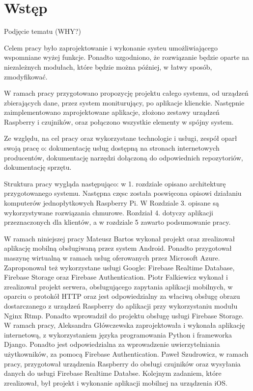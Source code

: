 \chapter{Wstęp}

Podjęcie tematu (WHY?)

Celem pracy było zaprojektowanie i wykonanie systeu umożliwiającego wspomniane wyżej funkcje. Ponadto uzgodniono, że rozwiązanie będzie oparte na niezależnych modułach, które będzie można później, w łatwy sposób, zmodyfikować.

W ramach pracy przygotowano propozycję projektu całego systemu, od urządzeń zbierających dane, przez system moniturujący, po aplikacje klienckie. Następnie zaimplementowano zaprojektowane aplikacje, złożono zestawy urządzeń Raspberry i czujników, oraz połączono wszystkie elementy w spójny system.

Ze względu, na cel pracy oraz wykorzystane technologie i usługi, zespół oparł swoją pracę o: dokumentację usług dostępną na stronach internetowych producentów, dokumentację narzędzi dołączoną do odpowiednich repozytoriów, dokumentację sprzętu.

Struktura pracy wygląda następująco: w 1. rozdziale opisano architekturę przygotowanego systemu. Następna częsc została poswięcona opisowi działaniu komputerów jednopłytkowych Raspberry Pi. W Rozdziale 3. opisane są wykorzystywane rozwiązania chmurowe. Rozdział 4. dotyczy aplikacji przeznaczonych dla klientów, a w rozdziale 5 zawarto podsumowanie pracy.

W ramach niniejszej pracy Mateusz Bartos wykonał projekt oraz zrealizował aplikację mobilną obsługiwaną przez system Android. Ponadto przygotował maszynę wirtualną w ramach usług oferowanych przez Microsoft Azure. Zaproponował też wykorzystane usługi Google: Firebase Realtime Database, Firebase Storage oraz Firebase Authentication. 
Piotr Falkiewicz wykonał i zrealizował projekt serwera, obsługującego zapytania aplikacji mobilnych, w oparciu o protokół HTTP oraz jest odpowiedzialny za właciwą obsługę  obrazu dostarczanego z urządzeń Raspberry do aplikacji przy wykorzystaniu modułu Nginx Rtmp. Ponadto wprowadził do projektu obsługę usługi Firebase Storage.
W ramach pracy, Aleksandra Główczewska zaprojektowała i wykonała aplikację internetową, z wykorzystaniem języka programowania Python i frameworka Django. Ponadto jest odpowiedzialna za wprowadzenie uwierzytelniania użytkowników, za pomocą Firebase Authentication. 
Paweł Szudrowicz, w ramach pracy, przygotował urządzenia Raspberry do obsługi czujników oraz wysyłania danych do usługi Firebase Realtime Databse. Kolejnym zadaniem, które zrealizował, był projekt i wykonanie aplikacji mobilnej na urządzenia iOS.
